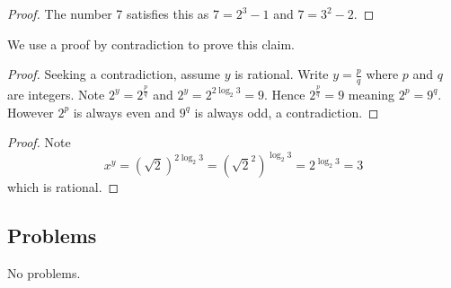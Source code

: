 \begin{questions}
    \item \begin{proof}
        The number 7 satisfies this as $7 = 2^3 - 1$ and $7 = 3^2 - 2$.
    \end{proof}

    \item \begin{partquestions}{\roman*}
        \item We use a proof by contradiction to prove this claim.

        \begin{proof}
            Seeking a contradiction, assume $y$ is rational. Write $y = \frac pq$ where $p$ and $q$ are integers. Note $2^y = 2^{\frac pq}$ and $2^y = 2^{2\log_2{3}} = 9$. Hence $2^{\frac pq} = 9$ meaning $2^p = 9^q$. However $2^p$ is always even and $9^q$ is always odd, a contradiction.
        \end{proof}

        \item \begin{proof}
            Note
            \[
                x^y = (\sqrt2)^{2\log_2{3}} = \left(\sqrt{2}^2\right)^{\log_2{3}} = 2^{\log_2{3}} = 3
            \]
            which is rational.
        \end{proof}
    \end{partquestions}
\end{questions}

\subsection*{Problems}
No problems.
